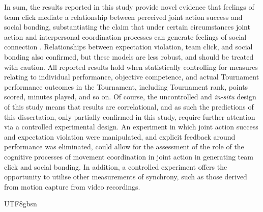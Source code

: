 \begin{CJK}{UTF8}{gbsn}
  In sum, the results reported in this study provide novel evidence that feelings of team click mediate a relationship between perceived joint action success and social bonding, substantiating the claim that under certain circumstances joint action and interpersonal coordination processes can generate feelings of social connection \citep{Marsh2009}. Relationships between expectation violation, team click, and social bonding
  also confirmed, but these models are less robust, and should be treated with caution. All reported results hold when statistically controlling for measures relating to individual performance, objective competence, and actual Tournament performance outcomes in the Tournament, including Tournament rank, points scored, minutes played, and so on.  Of course, the uncontrolled and \textit{in-situ} design of this study means that results are correlational, and as such the predictions of this dissertation, only partially confirmed in this study, require further attention via a controlled experimental design.  An experiment in which joint action success and expectation violation were manipulated, and explicit feedback around performance was eliminated, could allow for the assessment of the role of the cognitive processes of movement coordination in joint action in generating team click and social bonding.  In addition, a controlled experiment offers the opportunity to utilise other measurements of synchrony, such as those derived from motion capture from video recordings.


                                                \end{CJK}{UTF8}{gbsn}

